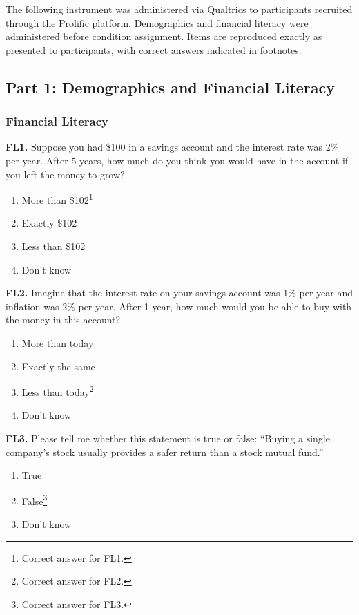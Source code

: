 The following instrument was administered via Qualtrics to participants recruited through the Prolific platform. Demographics and financial literacy were administered before condition assignment. Items are reproduced exactly as presented to participants, with correct answers indicated in footnotes.

\subsection{Part 1: Demographics and Financial Literacy}

\subsubsection{Financial Literacy \textnormal{\citep{LusardiMitchell2014}}}

\noindent\textbf{FL1.} Suppose you had \$100 in a savings account and the interest rate was 2\% per year. After 5 years, how much do you think you would have in the account if you left the money to grow?

\begin{enumerate}[label=\arabic*.]
  \item More than \$102\footnote{Correct answer for FL1.}
  \item Exactly \$102
  \item Less than \$102
  \item Don't know
\end{enumerate}

\noindent\textbf{FL2.} Imagine that the interest rate on your savings account was 1\% per year and inflation was 2\% per year. After 1 year, how much would you be able to buy with the money in this account?

\begin{enumerate}[label=\arabic*.]
  \item More than today
  \item Exactly the same
  \item Less than today\footnote{Correct answer for FL2.}
  \item Don't know
\end{enumerate}

\noindent\textbf{FL3.} Please tell me whether this statement is true or false: ``Buying a single company's stock usually provides a safer return than a stock mutual fund.''

\begin{enumerate}[label=\arabic*.]
  \item True
  \item False\footnote{Correct answer for FL3.}
  \item Don't know
\end{enumerate}

